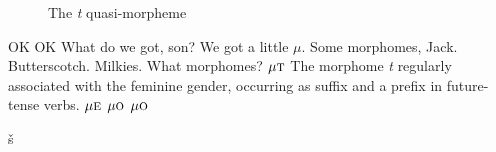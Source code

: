 \begin{figure}
\begin{center}
\end{center}
\caption{The \textit{t} quasi-morpheme}
\label{fig:t}
\end{figure}

OK OK What do we got, son? We got a little $\mu$. Some morphomes, Jack. Butterscotch. Milkies. What morphomes?
$\mu\textsc{t}$ The morphome \textit{t} regularly associated with the feminine 
gender, occurring as suffix and a prefix in future-tense verbs.
$\mu\textsc{e}$
$\mu{\textsc{o}}$
$\mu{\textsc{o}}$

  \v{s} \textglotstop



